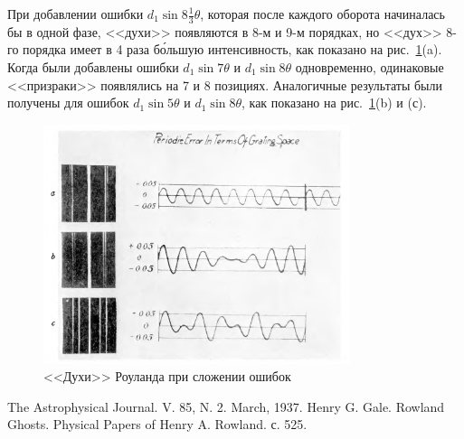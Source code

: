 \documentclass[a4paper, 12pt]{article}
\begin{document}
При добавлении ошибки $d_1 \sin{8\frac{1}{3}\theta}$, которая после каждого оборота начиналась бы в одной фазе, <<духи>> появляются в 8-м и 9-м порядках, но <<дух>> 8-го порядка имеет в 4 раза б\'{о}льшую интенсивность, как показано на рис.~\ref{fig:sum_periods}(a). Когда были добавлены ошибки $d_1 \sin{7\theta}$ и $d_1 \sin{8\theta}$ одновременно, одинаковые <<призраки>> появлялись на 7 и 8 позициях. Аналогичные результаты были получены для ошибок $d_1 \sin{5\theta}$ и $d_1 \sin{8\theta}$, как показано на рис.~\ref{fig:sum_periods}(b) и (с).

\newpage

\begin{figure}[h!]
\begin{center}
    \includegraphics[width=0.8\textwidth]{sum_periods.png}
\end{center}
\caption{<<Духи>> Роуланда при сложении ошибок}
\label{fig:sum_periods}
\end{figure}

\begin{thebibliography}{99}
The Astrophysical Journal. V. 85, N. 2. March, 1937. Henry G. Gale. Rowland Ghosts.
Physical Papers of Henry A. Rowland. с. 525.
\end{thebibliography}

%
%
%
\end{document}
